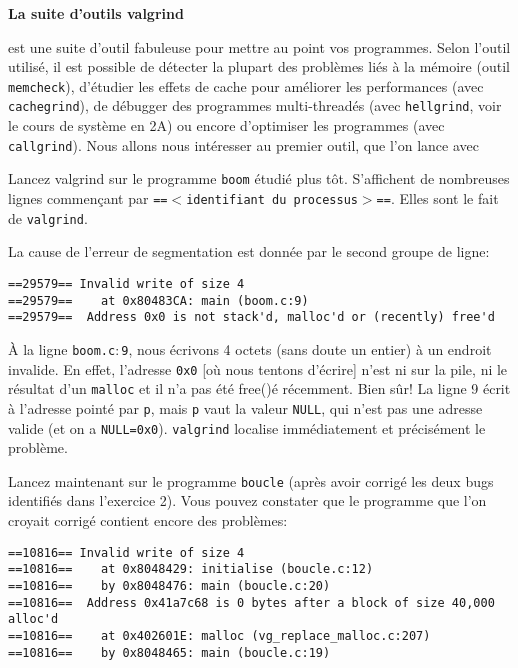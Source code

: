 \documentclass[10pt]{article}\usepackage[nu]{esial}
\begin{document}
\begin{Exercice}\textbf{La suite d'outils valgrind}
  
   est une suite d'outil fabuleuse pour mettre au point vos
  programmes. Selon l'outil utilisé, il est possible de détecter la plupart des
  problèmes liés à la mémoire (outil \texttt{memcheck}), d'étudier les effets
  de cache pour améliorer les performances (avec \texttt{cachegrind}), de
  débugger des programmes multi-threadés (avec \texttt{hellgrind}, voir le
  cours de système en 2A) ou encore d'optimiser les programmes (avec
  \texttt{callgrind}). Nous allons nous intéresser au premier outil, que l'on
  lance avec 

  \Question Lancez valgrind sur le programme \texttt{boom} étudié plus
  tôt. S'affichent de nombreuses lignes commençant par \texttt{==$<$identifiant
    du processus$>$==}. Elles sont le fait de \texttt{valgrind}.

  La cause de l'erreur de segmentation est donnée par le second groupe de
  ligne:
  \begin{Verbatim}
==29579== Invalid write of size 4
==29579==    at 0x80483CA: main (boom.c:9)
==29579==  Address 0x0 is not stack'd, malloc'd or (recently) free'd    
  \end{Verbatim}

  À la ligne \texttt{boom.c$:$9}, nous écrivons 4 octets (sans doute un entier)
  à un endroit invalide. En effet, l'adresse \texttt{0x0} [où nous tentons
  d'écrire] n'est ni sur la pile, ni le résultat d'un \texttt{malloc} et il n'a
  pas été free()é récemment. Bien sûr! La ligne 9 écrit à l'adresse pointé par
  \texttt{p}, mais \texttt{p} vaut la valeur \texttt{NULL}, qui n'est pas une
  adresse valide (et on a \texttt{NULL=0x0}). \texttt{valgrind} localise
  immédiatement et précisément le problème.

  \Question Lancez maintenant  sur le programme \texttt{boucle}
  (après avoir corrigé les deux bugs identifiés dans l'exercice 2). Vous pouvez
  constater que le programme que l'on croyait corrigé contient encore des
  problèmes:
  \begin{Verbatim}
==10816== Invalid write of size 4
==10816==    at 0x8048429: initialise (boucle.c:12)
==10816==    by 0x8048476: main (boucle.c:20)
==10816==  Address 0x41a7c68 is 0 bytes after a block of size 40,000 alloc'd
==10816==    at 0x402601E: malloc (vg_replace_malloc.c:207)
==10816==    by 0x8048465: main (boucle.c:19)    
  \end{Verbatim}


\end{Exercice}
\end{document}
